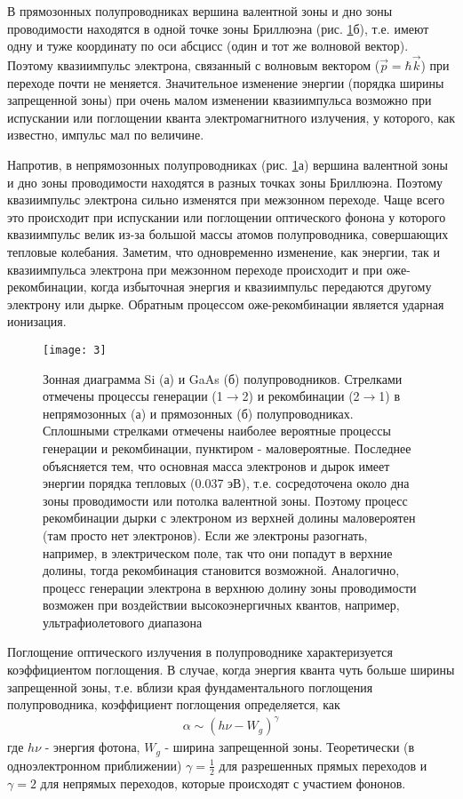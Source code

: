 \documentclass[a4paper,12pt]{article}
\begin{document}
В прямозонных полупроводниках вершина валентной зоны и дно зоны проводимости находятся в одной точке зоны Бриллюэна (рис.  \ref{fig:figure2}б), т.е. имеют одну и туже координату по оси абсцисс (один и тот же волновой вектор). Поэтому квазиимпульс электрона, связанный с волновым вектором ($\vec{p}=\hbar \vec{k}$) при переходе почти не меняется. Значительное изменение энергии (порядка ширины запрещенной зоны) при очень малом изменении квазиимпульса возможно при испускании или поглощении кванта электромагнитного излучения, у которого, как известно, импульс мал по величине.

Напротив, в непрямозонных полупроводниках (рис.  \ref{fig:figure2}а) вершина валентной зоны и дно зоны проводимости находятся в разных точках зоны Бриллюэна. Поэтому квазиимпульс электрона сильно изменятся при межзонном переходе. Чаще всего это происходит при испускании или поглощении оптического фонона у которого квазиимпульс велик из-за большой массы атомов полупроводника, совершающих тепловые колебания. Заметим, что одновременно изменение, как энергии, так и квазиимпульса электрона при межзонном переходе происходит и при оже-рекомбинации, когда избыточная энергия и квазиимпульс передаются другому электрону или дырке. Обратным процессом оже-рекомбинации является ударная ионизация.

\begin{figure}[H]
	\centering
	\texttt{[image: 3]}
	\caption{Зонная диаграмма Si (а) и GaAs (б) полупроводников. 
Стрелками отмечены процессы генерации (1$\to$2) и рекомбинации (2$\to$1) в непрямозонных (а) и прямозонных (б) полупроводниках.    Сплошными
стрелками отмечены наиболее вероятные процессы генерации и рекомбинации, пунктиром - маловероятные. Последнее объясняется тем, что основная масса электронов и дырок имеет энергии порядка тепловых (0.037 эВ), т.е. сосредоточена около дна зоны проводимости или потолка валентной зоны. Поэтому процесс рекомбинации дырки с электроном из верхней долины маловероятен (там просто нет электронов). Если же электроны разогнать, например, в электрическом поле, так что они попадут в верхние долины, тогда рекомбинация становится возможной. Аналогично, процесс генерации электрона в верхнюю долину зоны проводимости возможен при воздействии высокоэнергичных квантов, например, ультрафиолетового диапазона}
	\label{fig:figure2}
\end{figure}
% 

Поглощение оптического излучения в полупроводнике характеризуется коэффициентом поглощения. В случае, когда энергия кванта чуть больше ширины запрещенной зоны, т.е. вблизи края фундаментального поглощения полупроводника, коэффициент поглощения определяется, как 
\begin{gather}
	\label{eq3}
	\alpha \sim\left(h\nu-W_{g}\right)^{\gamma}
\end{gather}
где $h\nu$ - энергия фотона, $W_g$ - ширина запрещенной зоны. Теоретически (в одноэлектронном приближении) $\gamma=\frac12$ для разрешенных
прямых переходов и $\gamma=2$ для непрямых переходов, которые происходят с участием фононов.
\end{document}
